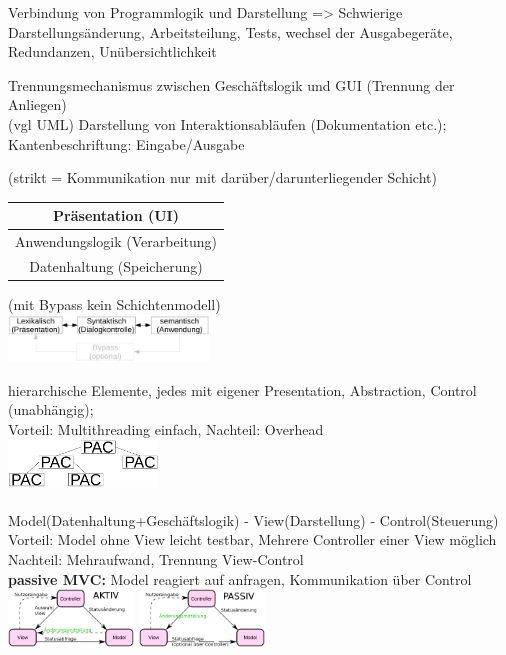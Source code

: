  Verbindung von Programmlogik und Darstellung => Schwierige Darstellungsänderung, Arbeitsteilung, Tests, wechsel der Ausgabegeräte, Redundanzen, Unübersichtlichkeit

 Trennungsmechanismus zwischen Geschäftslogik und GUI (Trennung der Anliegen)\\
 (vgl UML) Darstellung von Interaktionsabläufen (Dokumentation etc.); Kantenbeschriftung: Eingabe/Ausgabe

(strikt = Kommunikation nur mit darüber/darunterliegender Schicht)

\tab \begin{tabular}{|c|}
\hline
Präsentation (UI)\\
\hline
Anwendungslogik (Verarbeitung)\\
\hline
Datenhaltung (Speicherung)\\
\hline
\end{tabular}

(mit Bypass kein Schichtenmodell) \\
\tab \includegraphics[width=0.4\textwidth]{Seeheim}

hierarchische Elemente, jedes mit eigener Presentation, Abstraction, Control (unabhängig); \\
Vorteil: Multithreading einfach, Nachteil: Overhead    \\
\tab \includegraphics[width=0.3\textwidth]{PAC} \\ \\ 

Model(Datenhaltung+Geschäftslogik) - View(Darstellung) - Control(Steuerung)\\
Vorteil: Model ohne View leicht testbar, Mehrere Controller einer View möglich\\
Nachteil: Mehraufwand, Trennung View-Control \\
\textbf{passive MVC:} Model reagiert auf anfragen, Kommunikation über Control\\
\includegraphics[width=0.25\textwidth]{aMVC} \includegraphics[width=0.25\textwidth]{pMVC} 

